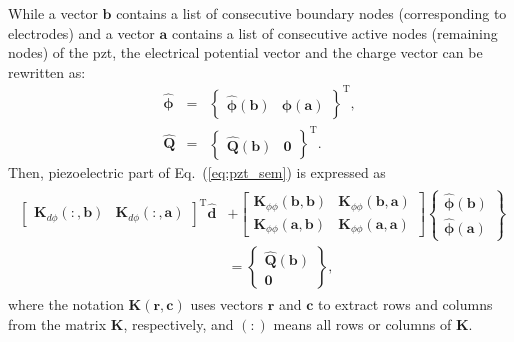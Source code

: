 While a vector \(\textbf{b}\) contains a list of consecutive boundary nodes (corresponding to electrodes) and a vector \(\textbf{a}\) contains a list of consecutive active nodes (remaining nodes) of the \ac{pzt}, the electrical potential vector and the charge vector can be rewritten as:
\begin{eqnarray}
	\widehat{\boldsymbol{\phi}} & = & \left \{\begin{array}{cc}
		\widehat{\boldsymbol{\phi}}(\textbf{b}) &
		\widehat{\boldsymbol{\phi}}(\textbf{a})
	\end{array}\right \}^{\mathrm{T}},\\
	\widehat{\textbf{Q}} & = & \left \{\begin{array}{cc}
		\widehat{\textbf{Q}}(\textbf{b}) & \textbf{0}
	\end{array}\right \}^{\mathrm{T}}.
	\label{eq:phi_Q}
\end{eqnarray}
Then, piezoelectric part of Eq.~(\ref{eq:pzt_sem}) is expressed as
\begin{eqnarray}
	\begin{split}
		\left [\begin{array}{cc}
			\textbf{K}_{d \phi}(:,\textbf{b}) &
			\textbf{K}_{d \phi}(:,\textbf{a})
		\end{array}\right]^{\mathrm{T}}
		\widehat{\textbf{d}} & +
		\left [\begin{array}{cc}
			\textbf{K}_{\phi \phi}(\textbf{b},\textbf{b}) & \textbf{K}_{\phi 		\phi}(\textbf{b},\textbf{a})\\
			\textbf{K}_{\phi \phi}(\textbf{a},\textbf{b}) & \textbf{K}_{\phi \phi}(\textbf{a},\textbf{a})
		\end{array}\right]
		\left \{\begin{array}{c}
			\widehat{\boldsymbol{\phi}}(\textbf{b}) \\
			\widehat{\boldsymbol{\phi}}(\textbf{a})
		\end{array}\right \}\\ 
		& = \left \{\begin{array}{c}
			\widehat{\textbf{Q}}(\textbf{b}) \\
			\textbf{0}
		\end{array}\right \},
	\end{split}
	\label{eq:pztboundary}
\end{eqnarray}
where the notation \(\textbf{K}(\textbf{r},\textbf{c})\) uses vectors \(\textbf{r}\) and \(\textbf{c}\) to extract rows and columns from the matrix \(\textbf{K}\), respectively, and \((:)\) means all rows or columns of \(\textbf{K}\).
